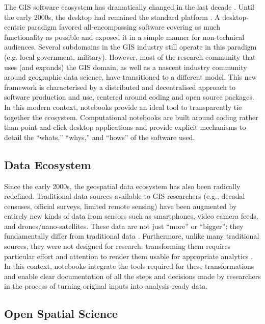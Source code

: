 \documentclass[11pt,letterpaper]{article}
\begin{document}
The GIS software ecosystem has dramatically changed in the last decade \citep{arribas-bel_geography_2018}. Until the early 2000s, the desktop had remained the standard platform \citep{gahegan_our_2018}. A desktop-centric paradigm favored all-encompassing software covering as much functionality as possible and exposed it in a simple manner for non-technical audiences. Several subdomains in the GIS industry still operate in this paradigm (e.g. local government, military). However, most of the research community that uses (and expands) the GIS domain, as well as a nascent industry community around geographic data science, have transitioned to a different model. This new framework is characterised by a distributed and decentralised approach to software production and use, centered around coding and open source packages. In this modern context, notebooks provide an ideal tool to transparently tie together the ecosystem. Computational notebooks are built around coding rather than point-and-click desktop applications and provide explicit mechanisms to detail the \enquote{whats,} \enquote{whys,} and \enquote{hows} of the software used.

\subsection{Data Ecosystem}

Since the early 2000s, the geospatial data ecosystem has also been radically redefined. Traditional data sources available to GIS researchers (e.g., decadal censuses, official surveys, limited remote sensing) have been augmented by entirely new kinds of data from sensors such as smartphones, video camera feeds, and drones/nano-satellites. These data are not just \enquote{more} or \enquote{bigger}; they fundamentally differ from traditional data \citep{kitchin_what_2016}. Furthermore, unlike many traditional sources, they were not designed for research: transforming them requires particular effort and attention to render them usable for appropriate analytics \citep{harris_more_2017,singleton_geographic_2019}. In this context, notebooks integrate the tools required for these transformations and enable clear documentation of all the steps and decisions made by researchers in the process of turning original inputs into analysis-ready data.

\subsection{Open Spatial Science}
\end{document}

